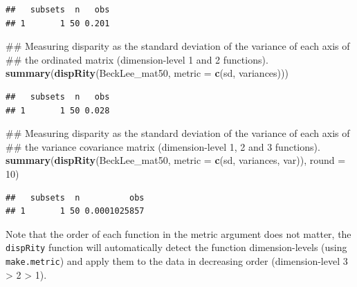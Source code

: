 \documentclass[]{book}
\newenvironment{Shaded}{\begin{snugshade}}{\end{snugshade}}
\newcommand{\KeywordTok}[1]{\textcolor[rgb]{0.13,0.29,0.53}{\textbf{#1}}}
\newcommand{\DataTypeTok}[1]{\textcolor[rgb]{0.13,0.29,0.53}{#1}}
\newcommand{\DecValTok}[1]{\textcolor[rgb]{0.00,0.00,0.81}{#1}}
\newcommand{\NormalTok}[1]{#1}
\theoremstyle{definition}
\theoremstyle{definition}
\theoremstyle{remark}
\begin{document}
\begin{verbatim}
##   subsets  n   obs
## 1       1 50 0.201
\end{verbatim}

\begin{Shaded}
\begin{Highlighting}[]
\NormalTok{## Measuring disparity as the standard deviation of the variance of each axis of}
\NormalTok{## the ordinated matrix (dimension-level 1 and 2 functions).}
\KeywordTok{summary}\NormalTok{(}\KeywordTok{dispRity}\NormalTok{(BeckLee_mat50, }\DataTypeTok{metric =} \KeywordTok{c}\NormalTok{(sd, variances)))}
\end{Highlighting}
\end{Shaded}

\begin{verbatim}
##   subsets  n   obs
## 1       1 50 0.028
\end{verbatim}

\begin{Shaded}
\begin{Highlighting}[]
\NormalTok{## Measuring disparity as the standard deviation of the variance of each axis of}
\NormalTok{## the variance covariance matrix (dimension-level 1, 2 and 3 functions).}
\KeywordTok{summary}\NormalTok{(}\KeywordTok{dispRity}\NormalTok{(BeckLee_mat50, }\DataTypeTok{metric =} \KeywordTok{c}\NormalTok{(sd, variances, var)), }\DataTypeTok{round =} \DecValTok{10}\NormalTok{)}
\end{Highlighting}
\end{Shaded}

\begin{verbatim}
##   subsets  n          obs
## 1       1 50 0.0001025857
\end{verbatim}

Note that the order of each function in the metric argument does not
matter, the \texttt{dispRity} function will automatically detect the
function dimension-levels (using \texttt{make.metric}) and apply them to
the data in decreasing order (dimension-level 3 \textgreater{} 2
\textgreater{} 1).
\end{document}
